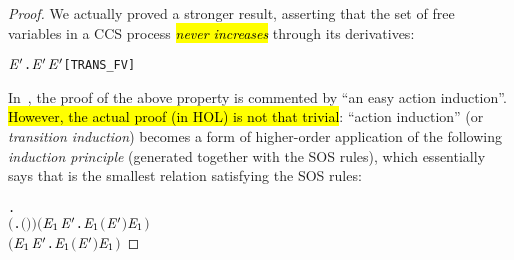 \begin{proof}
We actually proved a stronger result, asserting that the set of free
variables in a CCS process \hl{\emph{never increases}} through its derivatives:
\begin{alltt}
\HOLTokenTurnstile{} \HOLSymConst{\HOLTokenForall{}}  \ensuremath{\HOLBoundVar{E}\sp{\prime}}.  \HOLTokenTransBegin{}\HOLTokenTransEnd \ensuremath{\HOLBoundVar{E}\sp{\prime}} \HOLSymConst{\HOLTokenImp{}}  \ensuremath{\HOLBoundVar{E}\sp{\prime}} \HOLSymConst{\HOLTokenSubset{}}  \hfill{[TRANS_FV]}
\end{alltt}

In~\cite{milner1990operational}, the proof of the above property is 
commented by  ``an easy action induction''.
\hl{However, the actual proof (in HOL) is not that trivial}:
 ``action induction'' (or \emph{transition induction}) becomes a form of higher-order application
of the following \emph{induction principle} (generated together with the SOS
rules), which essentially says that  is the smallest relation
satisfying the SOS rules:
\begin{alltt}
\HOLTokenTurnstile{} \HOLSymConst{\HOLTokenForall{}}.
       \ensuremath{(}\HOLSymConst{\HOLTokenForall{}} .  \ensuremath{(}\HOLSymConst{\ensuremath{\ldotp}}\ensuremath{)}  \ensuremath{)} \HOLSymConst{\HOLTokenConj{}} \ensuremath{(}\HOLSymConst{\HOLTokenForall{}}  \ensuremath{\HOLBoundVar{E}\sb{\mathrm{1}}} \ensuremath{\HOLBoundVar{E}\sp{\prime}}.    \ensuremath{\HOLBoundVar{E}\sb{\mathrm{1}}} \HOLSymConst{\HOLTokenImp{}}  \ensuremath{(} \HOLSymConst{\ensuremath{+}} \ensuremath{\HOLBoundVar{E}\sp{\prime}}\ensuremath{)}  \ensuremath{\HOLBoundVar{E}\sb{\mathrm{1}}}\ensuremath{)} \HOLSymConst{\HOLTokenConj{}}
       \ensuremath{(}\HOLSymConst{\HOLTokenForall{}}  \ensuremath{\HOLBoundVar{E}\sb{\mathrm{1}}} \ensuremath{\HOLBoundVar{E}\sp{\prime}}.    \ensuremath{\HOLBoundVar{E}\sb{\mathrm{1}}} \HOLSymConst{\HOLTokenImp{}}  \ensuremath{(}\ensuremath{\HOLBoundVar{E}\sp{\prime}} \HOLSymConst{\ensuremath{+}} \ensuremath{)}  \ensuremath{\HOLBoundVar{E}\sb{\mathrm{1}}}\ensuremath{)} \HOLSymConst{\HOLTokenConj{}}

\end{alltt}
\end{proof}
